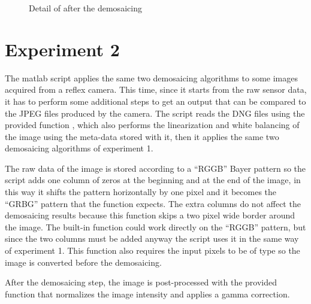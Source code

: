 \documentclass[a4paper,oneside]{article}
\begin{document}
\begin{figure}[htbp]
\begin{subfigure}{.5\textwidth}
  \caption{}
\end{subfigure}
\caption{Detail of  after the demosaicing}
\label{fig:artifact}
\end{figure}

\section*{Experiment 2}
The matlab script  applies the same two demosaicing
algorithms to some images acquired from a reflex camera. This time,
since it starts from the raw sensor data, it has to perform some
additional steps to get an output that can be compared to the JPEG
files produced by the camera. The script reads the DNG files using the
provided function , which also performs the
linearization and white balancing of the image using the meta-data
stored with it, then it applies the same two demosaicing algorithms
of experiment 1.

The raw data of the image is stored according to a ``RGGB'' Bayer
pattern so the script adds one column of zeros at the beginning and at
the end of the image, in this way it shifts the pattern horizontally
by one pixel and it becomes the ``GRBG'' pattern that the function
 expects. The extra columns do not affect
the demosaicing results because this function skips a two pixel wide
border around the image.  The built-in  function
could work directly on the ``RGGB'' pattern, but since the two columns
must be added anyway the script uses it in the same way of experiment
1. This function also requires the input pixels to be of type
 so the image is converted before the demosaicing.

After the demosaicing step, the image is post-processed with the
provided  function that normalizes the image
intensity and applies a gamma correction.
\end{document}
